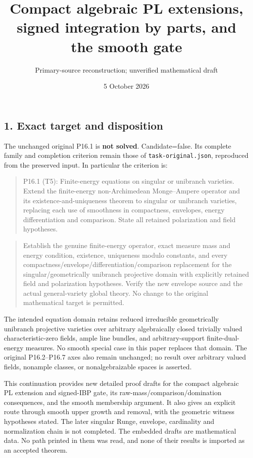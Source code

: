 \documentclass[
  10pt,
]{article}
\title{Compact algebraic PL extensions, signed integration by parts, and
the smooth gate}
\author{Primary-source reconstruction; unverified mathematical draft}
\date{5 October 2026}
\begin{document}
\maketitle

\subsection{1. Exact target and
disposition}\label{exact-target-and-disposition}

The unchanged original P16.1 is \textbf{not solved}. Candidate=false.
Its complete family and completion criterion remain those of
\texttt{task-original.json}, reproduced from the preserved input. In
particular the criterion is:

\begin{quote}
P16.1 (T5): Finite-energy equations on singular or unibranch varieties.
Extend the finite-energy non-Archimedean Monge--Ampere operator and its
existence-and-uniqueness theorem to singular or unibranch varieties,
replacing each use of smoothness in compactness, envelopes, energy
differentiation and comparison. State all retained polarization and
field hypotheses.
\end{quote}

\begin{quote}
Establish the genuine finite-energy operator, exact measure mass and
energy condition, existence, uniqueness modulo constants, and every
compactness/envelope/differentiation/comparison replacement for the
singular/geometrically unibranch projective domain with explicitly
retained field and polarization hypotheses. Verify the new envelope
source and the actual general-variety global theory. No change to the
original mathematical target is permitted.
\end{quote}

The intended equation domain retains reduced irreducible geometrically
unibranch projective varieties over arbitrary algebraically closed
trivially valued characteristic-zero fields, ample line bundles, and
arbitrary-support finite-dual-energy measures. No smooth special case in
this paper replaces that domain. The original P16.2--P16.7 axes also
remain unchanged; no result over arbitrary valued fields, nonample
classes, or nonalgebraizable spaces is asserted.

This continuation provides new detailed proof drafts for the compact
algebraic PL extension and signed-IBP gate, its
raw-mass/comparison/domination consequences, and the smooth membership
argument. It also gives an explicit route through smooth upper growth
and removal, with the geometric witness hypotheses stated. The later
singular Runge, envelope, cardinality and normalization chain is not
completed. The embedded drafts are mathematical data. No path printed in
them was read, and none of their results is imported as an accepted
theorem.
\end{document}
